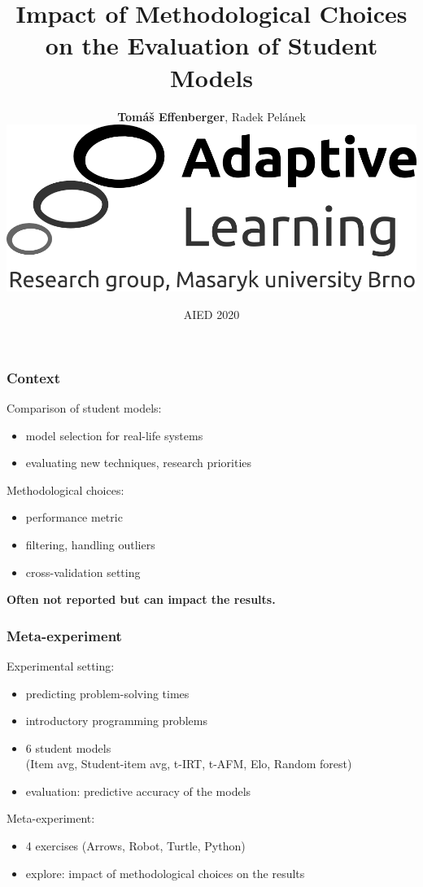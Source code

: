 \documentclass[bigger]{beamer}
\title{Impact of Methodological Choices\\on the Evaluation of Student Models}
\author{\textbf{Tom\'a\v{s} Effenberger}, Radek Pel\'anek\\[4mm]
\includegraphics[width=.35\linewidth]{figures/al-logo}\\[4mm]
}
\date{AIED 2020}
\begin{document}
\frame{\titlepage}

\begin{frame}
  \frametitle{Context}
  Comparison of student models:
  \begin{itemize}
  \item model selection for real-life systems
  \item evaluating new techniques, research priorities
  \end{itemize}

  \pause

  Methodological choices:
  \begin{itemize}
  \item performance metric
  \item filtering, handling outliers
  \item cross-validation setting
  \end{itemize}

  \pause

  \textbf{Often not reported but can impact the results.}

\end{frame}


\begin{frame}
  \frametitle{Meta-experiment}  %

  Experimental setting:
  \begin{itemize}
    \item predicting problem-solving times
    \item introductory programming problems
    \item 6 student models\\
    {\footnotesize (Item avg, Student-item avg, t-IRT, t-AFM, Elo, Random forest)}
    \item evaluation: predictive accuracy of the models %
  \end{itemize}

  \pause

  Meta-experiment:
  \begin{itemize}
    \item 4 exercises (Arrows, Robot, Turtle, Python)  %
    \item explore: impact of methodological choices on the results %
  \end{itemize}

\end{frame}
\end{document}
